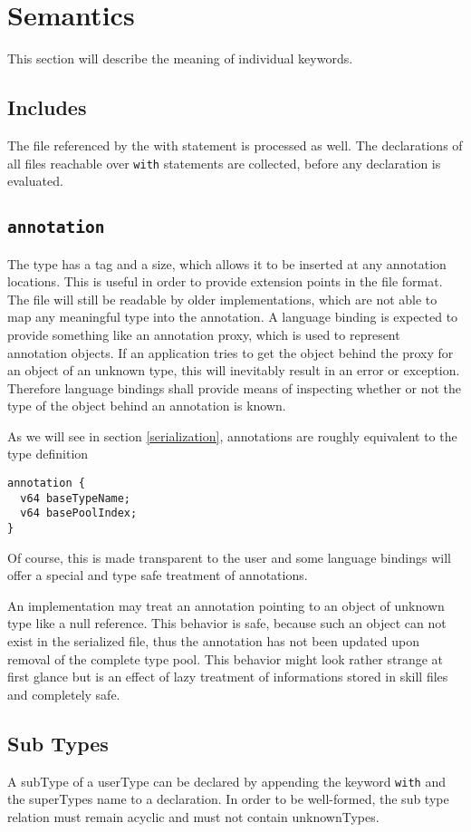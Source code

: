 
\section{Semantics}

This section will describe the meaning of individual keywords.

\subsection{Includes}
The file referenced by the with statement is processed as well. The declarations of all files reachable over \texttt{with} statements are collected, before any declaration is evaluated.

\subsection{\texttt{annotation}}
The type has a tag and a size, which allows it to be inserted at any annotation locations. This is useful in order to provide extension points in the file format. The file will still be readable by older implementations, which are not able to map any meaningful type into the annotation. A language binding is expected to provide something like an annotation proxy, which is used to represent annotation objects. If an application tries to get the object behind the proxy for an object of an unknown type, this will inevitably result in an error or exception. Therefore language bindings shall provide means of inspecting whether or not the type of the object behind an annotation is known.

As we will see in section \ref{serialization}, annotations are roughly equivalent to the type definition
\begin{verbatim}
annotation {
  v64 baseTypeName;
  v64 basePoolIndex;
}
\end{verbatim}
Of course, this is made transparent to the user and some language bindings will offer a special and type safe treatment of annotations.

An implementation may treat an annotation pointing to an object of unknown type like a null reference. This behavior is safe, because such an object can not exist in the serialized file, thus the annotation has not been updated upon removal of the complete type pool. This behavior might look rather strange at first glance but is an effect of lazy treatment of informations stored in skill files and completely safe.

\subsection{Sub Types}
A \gls{subType} of a \gls{userType} can be declared by appending the keyword \texttt{with} and the \gls{superType}s name to a declaration. In order to be well-formed, the sub type relation must remain acyclic and must not contain \glspl{unknownType}.

